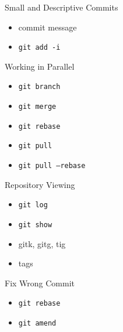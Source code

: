 \documentclass{beamer}
\begin{document}
\begin{frame}{Small and Descriptive Commits}
  \begin{itemize}
    \item commit message
    \item \texttt{git add -i}
  \end{itemize}
\end{frame}

\begin{frame}{Working in Parallel}
  \vspace{-2cm}\hspace{5cm}
  \hspace{-5cm}\vspace{-6cm}
  \begin{itemize}
    \item \texttt{git branch}
    \item \texttt{git merge}
    \item \texttt{git rebase}
    \pause
    \item \texttt{git pull}
    \item \texttt{git pull --rebase}
  \end{itemize}
  \vspace{-3cm}\hspace{5cm}
\end{frame}

\begin{frame}{Repository Viewing}
  \begin{itemize}
    \item \texttt{git log}
    \item \texttt{git show}
    \item gitk, gitg, tig
    \item tags
  \end{itemize}
\end{frame}

\begin{frame}{Fix Wrong Commit}
  \begin{itemize}
    \item \texttt{git rebase}
    \item \texttt{git amend}
  \end{itemize}
\end{frame}
\end{document}
